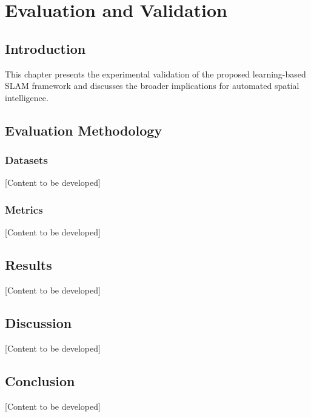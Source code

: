 \chapter{Evaluation and Validation} \label{chapter:evaluation}

\section{Introduction}

This chapter presents the experimental validation of the proposed learning-based SLAM framework and discusses the broader implications for automated spatial intelligence.

\section{Evaluation Methodology}

\subsection{Datasets}

[Content to be developed]

\subsection{Metrics}

[Content to be developed]

\section{Results}

[Content to be developed]

\section{Discussion}

[Content to be developed]

\section{Conclusion}

[Content to be developed]